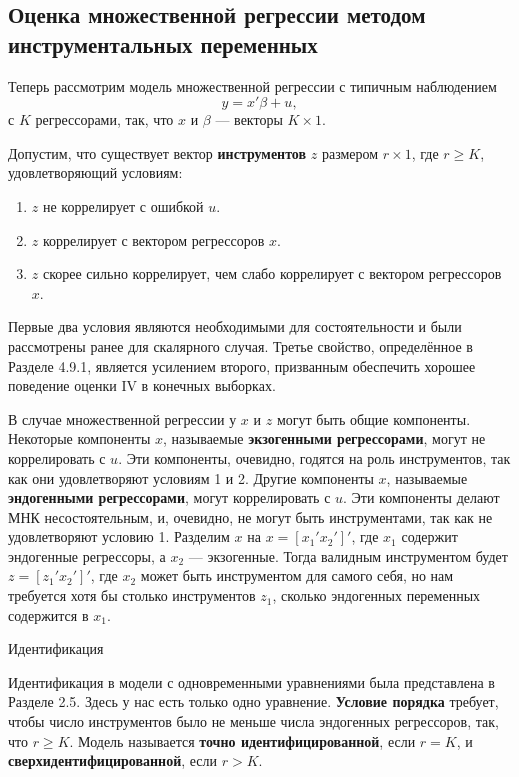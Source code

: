\subsection{Оценка множественной регрессии методом инструментальных переменных}

Теперь рассмотрим модель множественной регрессии с типичным наблюдением 
$$ y =x'\beta +u,$$
с $K$ регрессорами, так, что $x$ и $\beta$ --- векторы $K \times 1$.

Допустим, что существует вектор \textbf{инструментов} $z$ размером $r \times 1$, где $r\geq K$, удовлетворяющий условиям:
\begin{small}
\begin{enumerate}
\item $z$ не коррелирует с ошибкой $u$.
\item $z$ коррелирует с вектором регрессоров $x$.
\item $z$ скорее сильно коррелирует, чем слабо коррелирует с вектором регрессоров $x$.
\end{enumerate}
\end{small}
Первые два условия являются необходимыми для состоятельности и были рассмотрены ранее для скалярного случая. Третье свойство, определённое в Разделе 4.9.1, является усилением второго, призванным обеспечить хорошее поведение оценки IV в конечных выборках.

В случае множественной регрессии у $x$ и $z$ могут быть общие компоненты. Некоторые компоненты $x$, называемые \textbf{экзогенными регрессорами}, могут не коррелировать с $u$. Эти компоненты, очевидно, годятся на роль инструментов, так как они удовлетворяют условиям 1 и 2. Другие компоненты $x$, называемые \textbf{эндогенными регрессорами}, могут коррелировать с $u$. Эти компоненты делают МНК несостоятельным, и, очевидно, не могут быть инструментами, так как не удовлетворяют условию 1. Разделим $x$ на $x = [x_1' x_2']'$, где $x_1$ содержит эндогенные регрессоры, а $x_2$ --- экзогенные. Тогда валидным инструментом будет $z = [z_1' x_2']'$, где $x_2$ может быть инструментом для самого себя, но нам требуется хотя бы столько инструментов $z_1$, сколько эндогенных переменных содержится в $x_1$. 
\begin{center}
Идентификация
\end{center}
Идентификация в модели с одновременными уравнениями была представлена в Разделе 2.5. Здесь у нас есть только одно уравнение. \textbf{Условие порядка} требует, чтобы число инструментов было не меньше числа эндогенных регрессоров, так, что $r \geq K$. Модель называется \textbf{точно идентифицированной}, если $r=K$, и \textbf{сверхидентифицированной}, если $r>K$.

